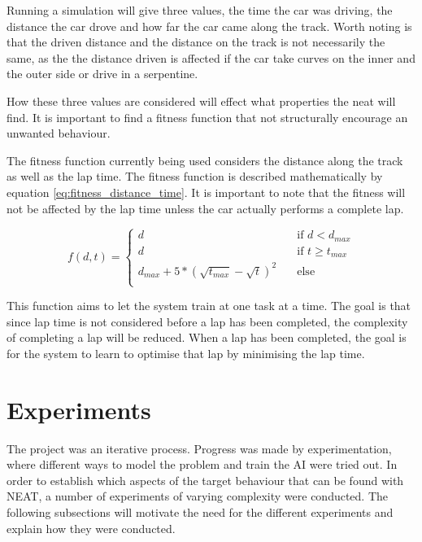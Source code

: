 Running a simulation will give three values, the time the car was driving, the distance the car drove and how far the car came along the track. Worth noting is that the driven distance and the distance on the track is not necessarily the same, as the the distance driven is affected if the car take curves on the inner and the outer side or drive in a serpentine.

How these three values are considered will effect what properties the neat will find. It is important to find a fitness function that not structurally encourage an unwanted behaviour.

The fitness function currently being used considers the distance along the track as well as the lap time. The fitness function is described mathematically by equation \ref{eq:fitness_distance_time}. It is important to note that the fitness will not be affected by the lap time unless the car actually performs a complete lap.

\begin{equation}
\label{eq:fitness_distance_time}
  f(d, t) =
  \begin{cases}
    d    & \quad \text{if } d < d_{max} \\
    d    & \quad \text{if } t \geq t_{max} \\
    d_{max} + 5*(\sqrt{t_{max}} - \sqrt{t})^2    &\quad \text{else} \\
  \end{cases}
\end{equation}

\noindent
This function aims to let the system train at one task at a time. The goal is that since lap time is not considered before a lap has been completed, the complexity of completing a lap will be reduced. When a lap has been completed, the goal is for the system to learn to optimise that lap by minimising the lap time. 






\section{Experiments}

The project was an iterative process. Progress was made by experimentation, where different ways to model the problem and train the AI were tried out. In order to establish which aspects of the target behaviour that can be found with NEAT, a number of experiments of varying complexity were conducted. The following subsections will motivate the need for the different experiments and explain how they were conducted. 

